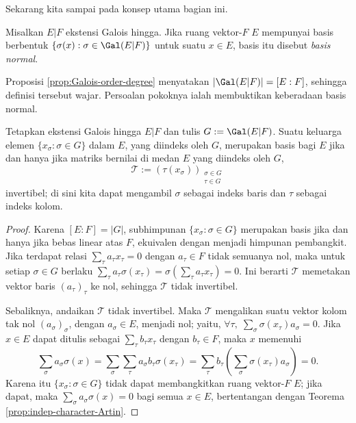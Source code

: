 Sekarang kita sampai pada konsep utama bagian ini.
\begin{definition}
	Misalkan $E|F$ ekstensi Galois hingga. Jika ruang vektor-$F$ $E$ mempunyai basis berbentuk $\{\sigma(x):\sigma\in\Gal(E|F)\}$ untuk suatu $x\in E$, basis itu disebut \emph{basis normal}.
\end{definition}
Proposisi \ref{prop:Galois-order-degree} menyatakan $|\Gal(E|F)|=[E:F]$, sehingga definisi tersebut wajar. Persoalan pokoknya ialah membuktikan keberadaan basis normal.

\begin{lemma}
	Tetapkan ekstensi Galois hingga $E|F$ dan tulis $G:=\Gal(E|F)$. Suatu keluarga elemen $\{x_\sigma:\sigma\in G\}$ dalam $E$, yang diindeks oleh $G$, merupakan basis bagi $E$ jika dan hanya jika matriks bernilai di medan $E$ yang diindeks oleh $G$,
	\[ \mathcal{T} := (\tau(x_\sigma))_{\substack{\sigma \in G \\ \tau \in G}} \]
	invertibel; di sini kita dapat mengambil $\sigma$ sebagai indeks baris dan $\tau$ sebagai indeks kolom.
\end{lemma}
\begin{proof}
	Karena $[E:F]=|G|$, subhimpunan $\{ x_\sigma : \sigma \in G \}$ merupakan basis jika dan hanya jika bebas linear atas $F$, ekuivalen dengan menjadi himpunan pembangkit. Jika terdapat relasi $\sum_\tau a_\tau x_\tau = 0$ dengan $a_\tau \in F$ tidak semuanya nol, maka untuk setiap $\sigma \in G$ berlaku $\sum_\tau a_\tau \sigma(x_\tau) = \sigma\left( \sum_\tau a_\tau x_\tau \right) = 0$. Ini berarti $\mathcal{T}$ memetakan vektor baris $(a_\tau)_\tau$ ke nol, sehingga $\mathcal{T}$ tidak invertibel.
	
	Sebaliknya, andaikan $\mathcal{T}$ tidak invertibel. Maka $\mathcal{T}$ mengalikan suatu vektor kolom tak nol $(a_\sigma)_\sigma$, dengan $a_\sigma \in E$, menjadi nol; yaitu, $\forall \tau, \; \sum_\sigma \sigma(x_\tau) a_\sigma = 0$. Jika $x \in E$ dapat ditulis sebagai $\sum_\tau b_\tau x_\tau$ dengan $b_\tau \in F$, maka $x$ memenuhi
	\[ \sum_\sigma a_\sigma \sigma(x) = \sum_\sigma \sum_\tau a_\sigma b_\tau \sigma(x_\tau) = \sum_\tau b_\tau \left( \sum_\sigma \sigma(x_\tau) a_\sigma \right) = 0. \]
	Karena itu $\{x_\sigma:\sigma\in G\}$ tidak dapat membangkitkan ruang vektor-$F$ $E$; jika dapat, maka $\sum_\sigma a_\sigma\sigma(x)=0$ bagi semua $x\in E$, bertentangan dengan Teorema \ref{prop:indep-character-Artin}.
\end{proof}

